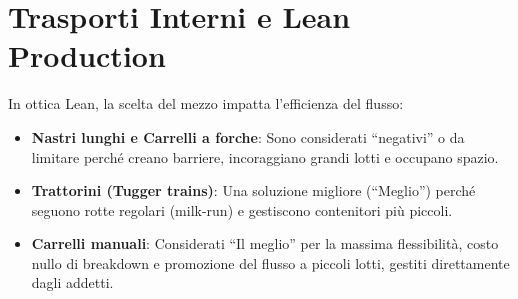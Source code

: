 %
\section{Trasporti Interni e Lean Production}
In ottica Lean, la scelta del mezzo impatta l'efficienza del flusso:
\begin{itemize}
    \item \textbf{Nastri lunghi e Carrelli a forche}: Sono considerati ``negativi'' o da limitare perché creano barriere, incoraggiano grandi lotti e occupano spazio.
    \item \textbf{Trattorini (Tugger trains)}: Una soluzione migliore (``Meglio'') perché seguono rotte regolari (milk-run) e gestiscono contenitori più piccoli.
    \item \textbf{Carrelli manuali}: Considerati ``Il meglio'' per la massima flessibilità, costo nullo di breakdown e promozione del flusso a piccoli lotti, gestiti direttamente dagli addetti.
\end{itemize}
